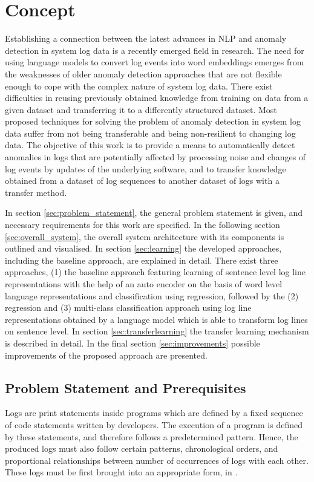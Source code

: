 \chapter{Concept \label{cha:concept}}
Establishing a connection between the latest advances in NLP and anomaly detection in system log data is a recently emerged field in research. The need for using language models to convert log events into word embeddings emerges from the weaknesses of older anomaly detection approaches that are not flexible enough to cope with the complex nature of system log data. There exist difficulties in reusing previously obtained knowledge from training on data from a given dataset and transferring it to a differently structured dataset. Most proposed techniques for solving the problem of anomaly detection in system log data suffer from not being transferable and being non-resilient to changing log data. The objective of this work is to provide a means to automatically detect anomalies in logs that are potentially affected by processing noise and changes of log events by updates of the underlying software, and to transfer knowledge obtained from a dataset of log sequences to another dataset of logs with a transfer method.

In section \ref{sec:problem_statement}, the general problem statement is given, and necessary requirements for this work are specified. 
In the following section \ref{sec:overall_system}, the overall system architecture with its components is outlined and visualised.
In section \ref{sec:learning} the developed approaches, including the baseline approach, are explained in detail. There exist three approaches, (1) the baseline approach featuring learning of sentence level log line representations with the help of an auto encoder on the basis of word level language representations and classification using regression, followed by the (2) regression and (3) multi-class classification approach using log line representations obtained by a language model which is able to transform log lines on sentence level.
In section \ref{sec:transferlearning} the transfer learning mechanism is described in detail.
In the final section \ref{sec:improvements} possible improvements of the proposed approach are presented.


\section{Problem Statement and Prerequisites \label{sec:problem_statement}}
Logs are print statements inside programs which are defined by a fixed sequence of code statements written by developers. The execution of a program is defined by these statements, and therefore follows a predetermined pattern. Hence, the produced logs must also follow certain patterns, chronological orders, and proportional relationships between number of occurrences of logs with each other. These logs must be first brought into an appropriate form, in .

